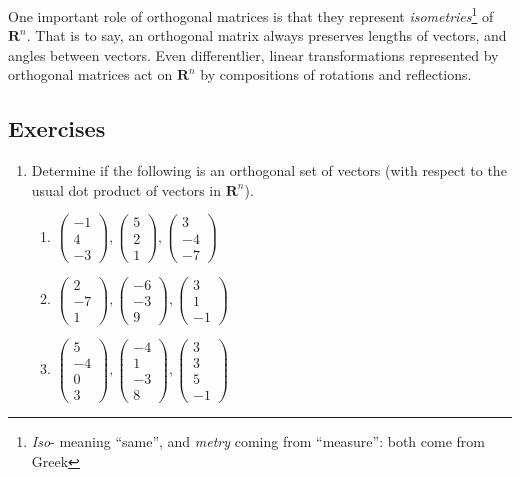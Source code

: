 \documentclass[12pt]{article}
\numberwithin{equation}{subsection}
\numberwithin{figure}{subsection}
\theoremstyle{note}
\newcommand{\R}{\mathbf{R}}
\begin{document}
One important role of orthogonal matrices is that they represent \textit{isometries}\footnote{\textit{Iso}- meaning ``same'', and \textit{metry} coming from ``measure'': both come from Greek} of $\R^n$. That is to say, an orthogonal matrix always preserves lengths of vectors, and angles between vectors. Even differentlier, linear transformations represented by orthogonal matrices act on $\R^n$ by compositions of rotations and reflections. 
\subsection{Exercises}

\begin{enumerate}[label=\arabic*.]

\item Determine if the following is an orthogonal set of vectors (with respect to the usual dot product of vectors in $\R^n$).
\begin{enumerate}
	\item $\begin{pmatrix}  -1 \\ 4 \\ -3\end{pmatrix}, \begin{pmatrix} 5 \\ 2 \\1\end{pmatrix},\begin{pmatrix}   3 \\ -4 \\ -7\end{pmatrix}$
	\item  $\begin{pmatrix}  2 \\ -7 \\ 1\end{pmatrix}, \begin{pmatrix}-6 \\ -3 \\ 9\end{pmatrix},\begin{pmatrix}   3 \\ 1 \\ -1\end{pmatrix}$
	\item  $\begin{pmatrix} 5 \\ -4 \\ 0 \\ 3\end{pmatrix}, \begin{pmatrix}  -4 \\ 1 \\ -3 \\ 8\end{pmatrix},\begin{pmatrix}   3 \\ 3\\ 5 \\ -1\end{pmatrix}$
\end{enumerate}


\end{enumerate}
\end{document}
